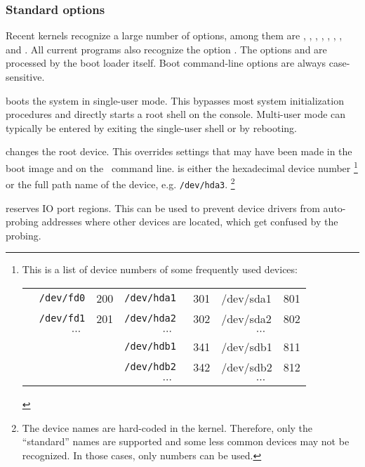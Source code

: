 \subsubsection{Standard options}

Recent kernels recognize a large number of options, among them are ,
, ,
, ,
, , and .
All current  programs also recognize the option .
The options  and  are processed by the boot loader itself.
Boot command-line options are always case-sensitive.

 boots the system in single-user mode. This bypasses most
system initialization procedures and directly starts a root shell on the
console. Multi-user mode can typically be entered by exiting the single-user
shell or by rebooting.

 changes the root device. This overrides
settings that may have been made in the boot image and on the
\LILO\ command line.  is either the hexadecimal device number
\footnote{%
This is a list of device numbers of some frequently used devices: \\
\begin{tabular}{lllllll}
\qquad
& {\tt /dev/fd0} & 200\qquad & \tt /dev/hda1 & 301\qquad & /dev/sda1 & 801 \\
& {\tt /dev/fd1} & 201 & \tt /dev/hda2 & 302 & /dev/sda2 & 802 \\
& \multicolumn{2}{c}{$\cdots$} & \multicolumn{2}{c}{$\cdots$} &
\multicolumn{2}{c}{$\cdots$} \\
& & & \tt /dev/hdb1 & 341 & /dev/sdb1 & 811 \\
& & & \tt /dev/hdb2 & 342 & /dev/sdb2 & 812 \\
& \multicolumn{2}{c}{} & \multicolumn{2}{c}{$\cdots$} &
\multicolumn{2}{c}{$\cdots$} \\
\end{tabular}}
or the full path name of the device, e.g. \verb"/dev/hda3".%
\footnote{The device names are hard-coded in the kernel. Therefore, only
the ``standard'' names are supported and some less common devices may not
be recognized. In those cases, only numbers can be used.}

 reserves IO port regions.
This can be used to prevent device drivers from auto-probing addresses
where other devices are located, which get confused by the probing.

